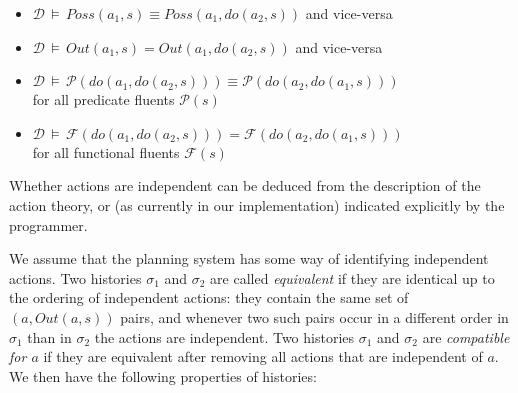 \begin{itemize}
\item $\mathcal{D}\,\models\, Poss(a_{1},s)\equiv Poss(a_{1},do(a_{2},s))$
and vice-versa 
\item $\mathcal{D}\,\models\, Out(a_{1},s)=Out(a_{1},do(a_{2},s))$ and
vice-versa
\item $\mathcal{D}\,\models\,\mathcal{P}(do(a_{1},do(a_{2},s)))\equiv\mathcal{P}(do(a_{2},do(a_{1},s)))$\\
 for all predicate fluents $\mathcal{P}(s)$
\item $\mathcal{D}\,\models\,\mathcal{F}(do(a_{1},do(a_{2},s)))=\mathcal{F}(do(a_{2},do(a_{1},s)))$\\
 for all functional fluents $\mathcal{F}(s)$
\end{itemize}
Whether actions are independent can be deduced from the description
of the action theory, or (as currently in our implementation) indicated
explicitly by the programmer.

We assume that the planning system has some way of identifying independent
actions. Two histories $\sigma_{1}$ and $\sigma_{2}$ are called
\emph{equivalent} if they are identical up to the ordering of independent
actions: they contain the same set of $(a,Out(a,s))$ pairs, and whenever
two such pairs occur in a different order in $\sigma_{1}$ than in
$\sigma_{2}$ the actions are independent. Two histories $\sigma_{1}$
and $\sigma_{2}$ are \emph{compatible for $a$ }if they are equivalent
after removing all actions that are independent of $a$. We then have
the following properties of histories:

